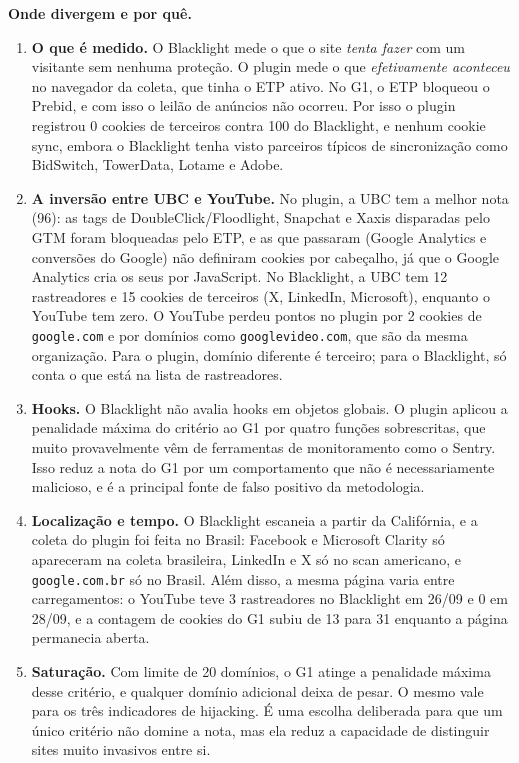 \documentclass[11pt,a4paper]{article}
\begin{document}
\textbf{Onde divergem e por quê.}
\begin{enumerate}
  \item \textbf{O que é medido.} O Blacklight mede o que o site \emph{tenta fazer} com um visitante sem nenhuma proteção. O plugin mede o que \emph{efetivamente aconteceu} no navegador da coleta, que tinha o ETP ativo. No G1, o ETP bloqueou o Prebid, e com isso o leilão de anúncios não ocorreu. Por isso o plugin registrou 0 cookies de terceiros contra 100 do Blacklight, e nenhum cookie sync, embora o Blacklight tenha visto parceiros típicos de sincronização como BidSwitch, TowerData, Lotame e Adobe.
  \item \textbf{A inversão entre UBC e YouTube.} No plugin, a UBC tem a melhor nota (96): as tags de DoubleClick/Floodlight, Snapchat e Xaxis disparadas pelo GTM foram bloqueadas pelo ETP, e as que passaram (Google Analytics e conversões do Google) não definiram cookies por cabeçalho, já que o Google Analytics cria os seus por JavaScript. No Blacklight, a UBC tem 12 rastreadores e 15 cookies de terceiros (X, LinkedIn, Microsoft), enquanto o YouTube tem zero. O YouTube perdeu pontos no plugin por 2 cookies de \texttt{google.\allowbreak{}com} e por domínios como \texttt{googlevideo.\allowbreak{}com}, que são da mesma organização. Para o plugin, domínio diferente é terceiro; para o Blacklight, só conta o que está na lista de rastreadores.
  \item \textbf{Hooks.} O Blacklight não avalia hooks em objetos globais. O plugin aplicou a penalidade máxima do critério ao G1 por quatro funções sobrescritas, que muito provavelmente vêm de ferramentas de monitoramento como o Sentry. Isso reduz a nota do G1 por um comportamento que não é necessariamente malicioso, e é a principal fonte de falso positivo da metodologia.
  \item \textbf{Localização e tempo.} O Blacklight escaneia a partir da Califórnia, e a coleta do plugin foi feita no Brasil: Facebook e Microsoft Clarity só apareceram na coleta brasileira, LinkedIn e X só no scan americano, e \texttt{google.\allowbreak{}com.\allowbreak{}br} só no Brasil. Além disso, a mesma página varia entre carregamentos: o YouTube teve 3 rastreadores no Blacklight em 26/09 e 0 em 28/09, e a contagem de cookies do G1 subiu de 13 para 31 enquanto a página permanecia aberta.
  \item \textbf{Saturação.} Com limite de 20 domínios, o G1 atinge a penalidade máxima desse critério, e qualquer domínio adicional deixa de pesar. O mesmo vale para os três indicadores de hijacking. É uma escolha deliberada para que um único critério não domine a nota, mas ela reduz a capacidade de distinguir sites muito invasivos entre si.
\end{enumerate}
\end{document}
